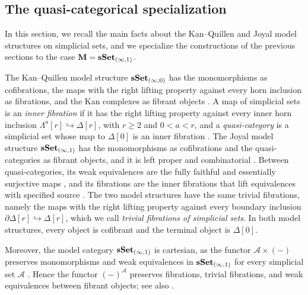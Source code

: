 \documentclass[10pt,reqno]{amsart}
\begin{document}
\subsection{The quasi-categorical specialization}
\label{subsec:prelim_simplicial_models}

In this section, we recall the main facts about the Kan--Quillen and
Joyal model structures on simplicial sets, and we specialize the
constructions of the previous sections to the case
$\mathbf M=\mathbf{sSet}_{(\infty,1)}$.

The Kan--Quillen model structure $\mathbf{sSet}_{(\infty,0)}$ has the
monomorphisms as cofibrations, the maps with the right lifting
property against every horn inclusion as fibrations, and the Kan
complexes as fibrant objects
\cite[Theorem~7.10.12]{hirschhorn2003model}.
A map of simplicial sets is an \emph{inner fibration} if it has the
right lifting property against every inner horn inclusion
$\Lambda^a[r]\hookrightarrow\Delta[r]$, with $r\geq2$ and
$0<a<r$, and a \emph{quasi-category} is a simplicial set whose map
to $\Delta[0]$ is an inner fibration
\cite[Definitions~1.1.2.4 and~2.0.0.3]{lurie2009higher}. The Joyal
model structure $\mathbf{sSet}_{(\infty,1)}$ has the monomorphisms as
cofibrations and the quasi-categories as fibrant objects, and it is
left proper and combinatorial
\cite[Theorems~2.2.5.1 and~2.4.6.1]{lurie2009higher}. Between
quasi-categories, its weak equivalences are the fully faithful and
essentially surjective maps
\cite[Tag~01JX, Theorem~4.8.4.1]{kerodon}, and its fibrations are the
inner fibrations that lift equivalences with specified source
\cite[Corollary~2.4.6.5]{lurie2009higher}. The two model structures
have the same trivial fibrations, namely the maps with the right
lifting property against every boundary inclusion
$\partial\Delta[r]\hookrightarrow\Delta[r]$, which we call
\emph{trivial fibrations of simplicial sets}. In both model
structures, every object is cofibrant and the terminal object is
$\Delta[0]$.

Moreover, the model category $\mathbf{sSet}_{(\infty,1)}$ is cartesian, as
the functor $\mathcal A\times(-)$ preserves monomorphisms and weak
equivalences in $\mathbf{sSet}_{(\infty,1)}$ for every simplicial set
$\mathcal A$ \cite[Corollary~2.2.5.4]{lurie2009higher}. Hence the
functor $(-)^{\mathcal A}$ preserves fibrations, trivial fibrations,
and weak equivalences between fibrant objects; see also
\cite[Proposition~8.5.7\textup{(2)}]{hirschhorn2003model}.
\end{document}
